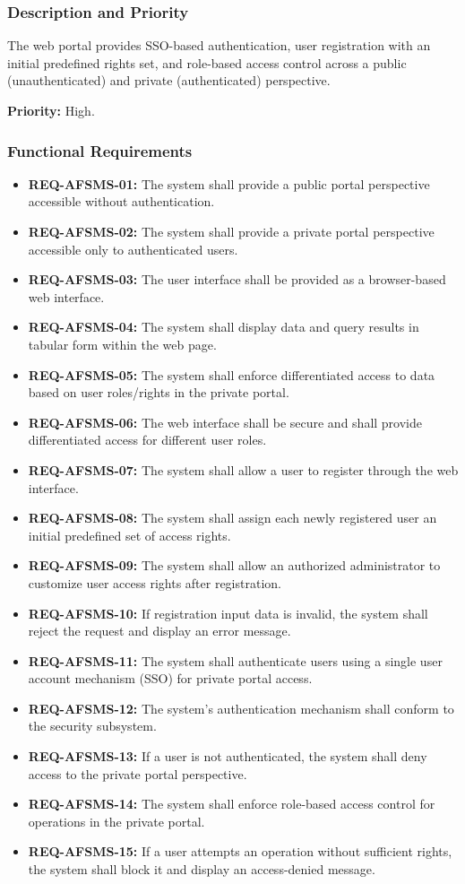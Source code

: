 \documentclass[11pt, a4paper]{article}
\begin{document}
\subsubsection{Description and Priority}
The web portal provides SSO-based authentication, user registration with an initial predefined rights set, and role-based access control across a public (unauthenticated) and private (authenticated) perspective.

\textbf{Priority:} High.

\subsubsection{Functional Requirements}
\begin{itemize}
    \item \textbf{REQ-AFSMS-01:} The system shall provide a public portal perspective accessible without authentication.
    \item \textbf{REQ-AFSMS-02:} The system shall provide a private portal perspective accessible only to authenticated users.
    \item \textbf{REQ-AFSMS-03:} The user interface shall be provided as a browser-based web interface.
    \item \textbf{REQ-AFSMS-04:} The system shall display data and query results in tabular form within the web page.
    \item \textbf{REQ-AFSMS-05:} The system shall enforce differentiated access to data based on user roles/rights in the private portal.
    \item \textbf{REQ-AFSMS-06:} The web interface shall be secure and shall provide differentiated access for different user roles.
    \item \textbf{REQ-AFSMS-07:} The system shall allow a user to register through the web interface.
    \item \textbf{REQ-AFSMS-08:} The system shall assign each newly registered user an initial predefined set of access rights.
    \item \textbf{REQ-AFSMS-09:} The system shall allow an authorized administrator to customize user access rights after registration.
    \item \textbf{REQ-AFSMS-10:} If registration input data is invalid, the system shall reject the request and display an error message.
    \item \textbf{REQ-AFSMS-11:} The system shall authenticate users using a single user account mechanism (SSO) for private portal access.
    \item \textbf{REQ-AFSMS-12:} The system's authentication mechanism shall conform to the security subsystem.
    \item \textbf{REQ-AFSMS-13:} If a user is not authenticated, the system shall deny access to the private portal perspective.
    \item \textbf{REQ-AFSMS-14:} The system shall enforce role-based access control for operations in the private portal.
    \item \textbf{REQ-AFSMS-15:} If a user attempts an operation without sufficient rights, the system shall block it and display an access-denied message.
\end{itemize}
\end{document}
